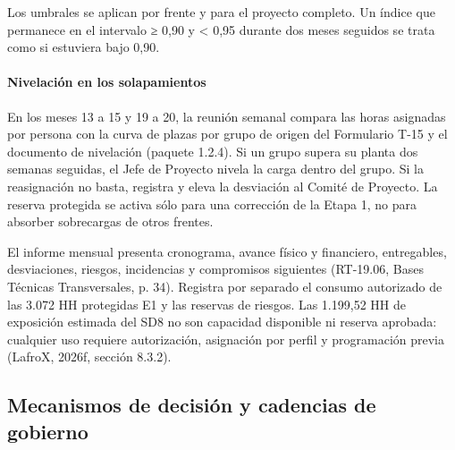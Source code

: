 \documentclass[carta,firma,final]{lafrox}
\begin{document}
Los umbrales se aplican por frente y para el proyecto completo. Un índice que permanece en el intervalo ≥ 0,90 y < 0,95 durante dos meses seguidos se trata como si estuviera bajo 0,90.

\paragraph{Nivelación en los solapamientos}
En los meses 13 a 15 y 19 a 20, la reunión semanal compara las horas asignadas por persona con la curva de plazas por grupo de origen del Formulario T-15 y el documento de nivelación (paquete 1.2.4). Si un grupo supera su planta dos semanas seguidas, el Jefe de Proyecto nivela la carga dentro del grupo. Si la reasignación no basta, registra y eleva la desviación al Comité de Proyecto. La reserva protegida se activa sólo para una corrección de la Etapa 1, no para absorber sobrecargas de otros frentes.

El informe mensual presenta cronograma, avance físico y financiero, entregables, desviaciones, riesgos, incidencias y compromisos siguientes (RT-19.06, Bases Técnicas Transversales, p. 34). Registra por separado el consumo autorizado de las 3.072 HH protegidas E1 y las reservas de riesgos. Las 1.199,52 HH de exposición estimada del SD8 no son capacidad disponible ni reserva aprobada: cualquier uso requiere autorización, asignación por perfil y programación previa (LafroX, 2026f, sección 8.3.2).

\subsection{Mecanismos de decisión y cadencias de gobierno}
\end{document}
